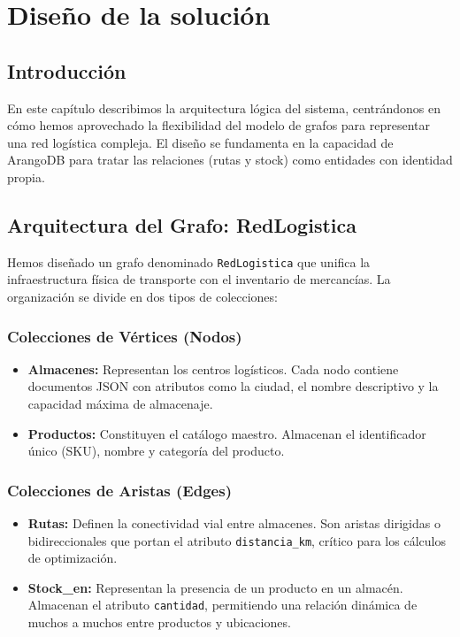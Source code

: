 \chapter{Diseño de la solución}\label{cap:diseño}

\section{Introducción}
En este capítulo describimos la arquitectura lógica del sistema, centrándonos en cómo hemos aprovechado la flexibilidad del modelo de grafos para representar una red logística compleja. El diseño se fundamenta en la capacidad de ArangoDB para tratar las relaciones (rutas y stock) como entidades con identidad propia.

\section{Arquitectura del Grafo: RedLogistica}
Hemos diseñado un grafo denominado \texttt{RedLogistica} que unifica la infraestructura física de transporte con el inventario de mercancías. La organización se divide en dos tipos de colecciones:

\subsection{Colecciones de Vértices (Nodos)}
\begin{itemize}
    \item \textbf{Almacenes:} Representan los centros logísticos. Cada nodo contiene documentos JSON con atributos como la ciudad, el nombre descriptivo y la capacidad máxima de almacenaje.
    \item \textbf{Productos:} Constituyen el catálogo maestro. Almacenan el identificador único (SKU), nombre y categoría del producto.
\end{itemize}

\subsection{Colecciones de Aristas (Edges)}
\begin{itemize}
    \item \textbf{Rutas:} Definen la conectividad vial entre almacenes. Son aristas dirigidas o bidireccionales que portan el atributo \texttt{distancia\_km}, crítico para los cálculos de optimización.
    \item \textbf{Stock\_en:} Representan la presencia de un producto en un almacén. Almacenan el atributo \texttt{cantidad}, permitiendo una relación dinámica de muchos a muchos entre productos y ubicaciones.
    \end{itemize}

